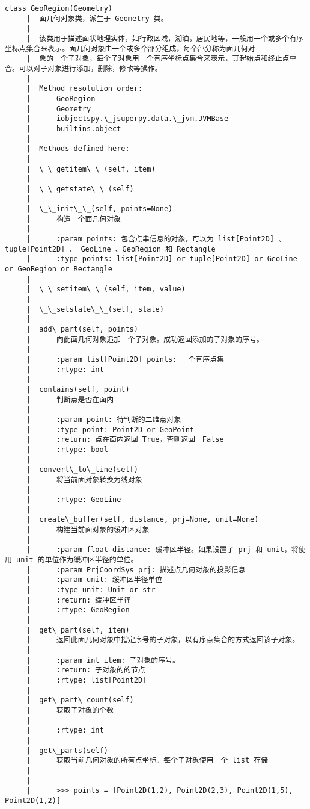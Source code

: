 \documentclass[11pt]{article}
\begin{document}
\begin{Verbatim}[commandchars=\\\{\}]
    class GeoRegion(Geometry)
     |  面几何对象类，派生于 Geometry 类。
     |  
     |  该类用于描述面状地理实体，如行政区域，湖泊，居民地等，一般用一个或多个有序坐标点集合来表示。面几何对象由一个或多个部分组成，每个部分称为面几何对
     |  象的一个子对象，每个子对象用一个有序坐标点集合来表示，其起始点和终止点重合。可以对子对象进行添加，删除，修改等操作。
     |  
     |  Method resolution order:
     |      GeoRegion
     |      Geometry
     |      iobjectspy.\_jsuperpy.data.\_jvm.JVMBase
     |      builtins.object
     |  
     |  Methods defined here:
     |  
     |  \_\_getitem\_\_(self, item)
     |  
     |  \_\_getstate\_\_(self)
     |  
     |  \_\_init\_\_(self, points=None)
     |      构造一个面几何对象
     |      
     |      :param points: 包含点串信息的对象，可以为 list[Point2D] 、tuple[Point2D] 、 GeoLine 、GeoRegion 和 Rectangle
     |      :type points: list[Point2D] or tuple[Point2D] or GeoLine or GeoRegion or Rectangle
     |  
     |  \_\_setitem\_\_(self, item, value)
     |  
     |  \_\_setstate\_\_(self, state)
     |  
     |  add\_part(self, points)
     |      向此面几何对象追加一个子对象。成功返回添加的子对象的序号。
     |      
     |      :param list[Point2D] points: 一个有序点集
     |      :rtype: int
     |  
     |  contains(self, point)
     |      判断点是否在面内
     |      
     |      :param point: 待判断的二维点对象
     |      :type point: Point2D or GeoPoint
     |      :return: 点在面内返回 True，否则返回　False
     |      :rtype: bool
     |  
     |  convert\_to\_line(self)
     |      将当前面对象转换为线对象
     |      
     |      :rtype: GeoLine
     |  
     |  create\_buffer(self, distance, prj=None, unit=None)
     |      构建当前面对象的缓冲区对象
     |      
     |      :param float distance: 缓冲区半径。如果设置了 prj 和 unit，将使用 unit 的单位作为缓冲区半径的单位。
     |      :param PrjCoordSys prj: 描述点几何对象的投影信息
     |      :param unit: 缓冲区半径单位
     |      :type unit: Unit or str
     |      :return: 缓冲区半径
     |      :rtype: GeoRegion
     |  
     |  get\_part(self, item)
     |      返回此面几何对象中指定序号的子对象，以有序点集合的方式返回该子对象。
     |      
     |      :param int item: 子对象的序号。
     |      :return: 子对象的的节点
     |      :rtype: list[Point2D]
     |  
     |  get\_part\_count(self)
     |      获取子对象的个数
     |      
     |      :rtype: int
     |  
     |  get\_parts(self)
     |      获取当前几何对象的所有点坐标。每个子对象使用一个 list 存储
     |      
     |      
     |      >>> points = [Point2D(1,2), Point2D(2,3), Point2D(1,5), Point2D(1,2)]

\end{Verbatim}
\end{document}
